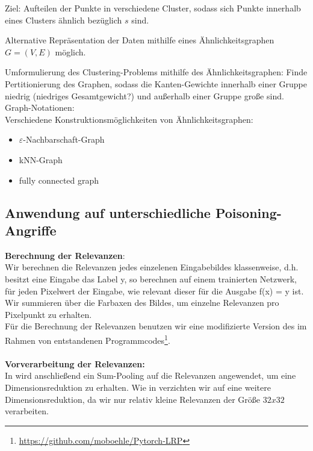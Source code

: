 \documentclass[11pt,a4paper]{article}
\numberwithin{equation}{section}
\begin{document}
	Ziel: Aufteilen der Punkte in verschiedene Cluster, sodass sich Punkte innerhalb eines Clusters ähnlich bezüglich $s$ sind.
	
	Alternative Repräsentation der Daten mithilfe eines Ähnlichkeitsgraphen $G=(V,E)$ möglich.
	
	Umformulierung des Clustering-Problems mithilfe des Ähnlichkeitsgraphen: Finde Pertitionierung des Graphen, sodass die Kanten-Gewichte innerhalb einer Gruppe niedrig (niedriges Gesamtgewicht?) und außerhalb einer Gruppe große sind.\\
	
	
	Graph-Notationen:\\
	
	Verschiedene Konstruktionsmöglichkeiten von Ähnlichkeitsgraphen:
	
	\begin{itemize}
		\item $\varepsilon$-Nachbarschaft-Graph\\
		\item kNN-Graph\\
		\item fully connected graph
	\end{itemize}
	
	
	\subsection{Anwendung auf unterschiedliche Poisoning-Angriffe} \label{chapter_results} \label{chapter_experiments}
	\noindent \textbf{Berechnung der Relevanzen}:\\
	
	\noindent Wir berechnen die Relevanzen jedes einzelenen Eingabebildes klassenweise, d.h. besitzt eine Eingabe das Label y, so berechnen auf einem trainierten Netzwerk, für jeden Pixelwert der Eingabe, wie relevant dieser für die Ausgabe f(x) = y ist.\\
	Wir summieren über die Farbaxen des Bildes, um einzelne Relevanzen pro Pixelpunkt zu erhalten.\\
	Für die Berechnung der Relevanzen benutzen wir eine modifizierte Version des im Rahmen von \cite{lrp_alzheimer} entstandenen Programmcodes\footnote{\url{https://github.com/moboehle/Pytorch-LRP}}.\\
	\\
	\noindent \textbf{Vorverarbeitung der Relevanzen:}\\
	In \cite{unmaskingCH} wird anschließend ein Sum-Pooling auf die Relevanzen angewendet, um eine Dimensionsreduktion zu erhalten. Wie in \cite{imagenet_unhansed_v1} verzichten wir auf eine weitere Dimensionsreduktion, da wir nur relativ kleine Relevanzen der Größe $32x32$ verarbeiten.	\\
	
\end{document}
